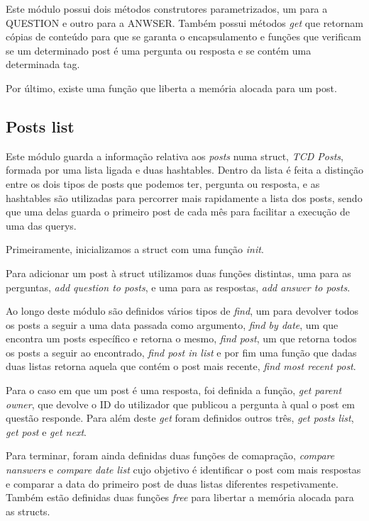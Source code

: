 \documentclass[a4paper]{article}
\begin{document}
	Este módulo possui dois métodos construtores parametrizados, um para a QUESTION e outro para a ANWSER. Também possui métodos \emph{get} que retornam cópias de conteúdo para que se garanta o encapsulamento e funções que verificam se um determinado post é uma pergunta ou resposta e se contém uma determinada tag.

	Por último, existe uma função que liberta a memória alocada para um post.

\subsection{Posts list}
	
	Este módulo guarda a informação relativa aos \emph{posts} numa struct, \emph{TCD Posts}, formada por uma lista ligada e duas hashtables. Dentro da lista é feita a distinção entre os dois tipos de posts que podemos ter, pergunta ou resposta, e as hashtables são utilizadas para percorrer mais rapidamente a lista dos posts, sendo que uma delas guarda o primeiro post de cada mês para facilitar a execução de uma das querys.

	Primeiramente, inicializamos a struct com uma função \emph{init}.

	Para adicionar um post à struct utilizamos duas funções distintas, uma para as perguntas, \emph{add question to posts}, e uma para as respostas, \emph{add answer to posts}.

	Ao longo deste módulo são definidos vários tipos de \emph{find}, um para devolver todos os posts a seguir a uma data passada como argumento, \emph{find by date}, um que encontra um posts específico e retorna o mesmo, \emph{find post}, um que retorna todos os posts a seguir ao encontrado, \emph{find post in list} e por fim uma função que dadas duas listas retorna aquela que contém o post mais recente, \emph{find most recent post}.

	Para o caso em que um post é uma resposta, foi definida a função, \emph{get parent owner}, que devolve o ID do utilizador que publicou a pergunta à qual o post em questão responde. Para além deste \emph{get} foram definidos outros três, \emph{get posts list}, \emph{get post} e \emph{get next}.

	Para terminar, foram ainda definidas duas funções de comapração, \emph{compare nanswers} e \emph{compare date list} cujo objetivo é identificar o post com mais respostas e comparar a data do primeiro post de duas listas diferentes respetivamente. Também estão definidas duas funções \emph{free} para libertar a memória alocada para as structs.
\end{document}
